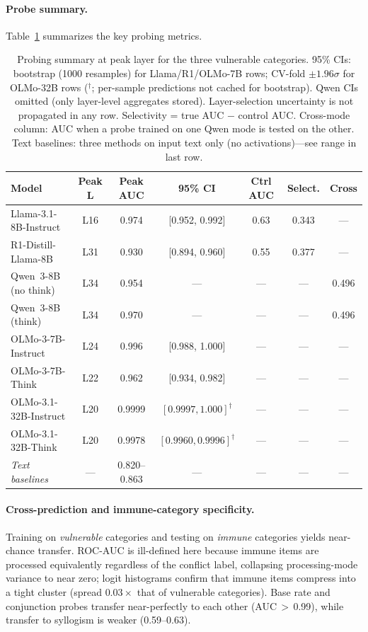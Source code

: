 \documentclass{article}
\begin{document}
\paragraph{Probe summary.}
Table~\ref{tab:probe_summary} summarizes the key probing metrics.

\begin{table}[t]
\centering
\caption{Probing summary at peak layer for the three
  vulnerable categories.  95\% CIs: bootstrap (1000 resamples) for
  Llama/R1/OLMo-7B rows; CV-fold $\pm 1.96\sigma$ for OLMo-32B rows
  (${}^\dagger$; per-sample predictions not cached for bootstrap).
  Qwen CIs omitted (only layer-level aggregates stored).
  Layer-selection uncertainty is not propagated in any row.
  Selectivity = true AUC $-$ control AUC.  Cross-mode column:
  AUC when a probe trained on one Qwen mode is tested on the other.
  Text baselines: three methods on input text only (no activations)---see range in last row.}
\label{tab:probe_summary}
\vspace{4pt}
\small
\begin{tabular}{lcccccc}
\toprule
\textbf{Model} & \textbf{Peak L} & \textbf{Peak AUC} & \textbf{95\% CI} & \textbf{Ctrl AUC} & \textbf{Select.} & \textbf{Cross} \\
\midrule
Llama-3.1-8B-Instruct & L16 & 0.974 & [0.952, 0.992] & 0.63 & 0.343 & --- \\
R1-Distill-Llama-8B   & L31 & 0.930 & [0.894, 0.960] & 0.55 & 0.377 & --- \\
Qwen~3-8B (no think)  & L34 & 0.954 & ---             & ---  & --- & 0.496 \\
Qwen~3-8B (think)     & L34 & 0.970 & ---             & ---  & --- & 0.496 \\
\midrule
OLMo-3-7B-Instruct    & L24 & 0.996 & [0.988, 1.000]  & ---  & --- & --- \\
OLMo-3-7B-Think       & L22 & 0.962 & [0.934, 0.982]  & ---  & --- & --- \\
\midrule
OLMo-3.1-32B-Instruct & L20 & 0.9999 & $[0.9997, 1.000]^\dagger$ & --- & --- & --- \\
OLMo-3.1-32B-Think    & L20 & 0.9978 & $[0.9960, 0.9996]^\dagger$ & --- & --- & --- \\
\midrule
\emph{Text baselines}  & --- & 0.820--0.863 & ---         & ---  & --- & --- \\
\bottomrule
\end{tabular}
\end{table}

\paragraph{Cross-prediction and immune-category specificity.}
Training on \emph{vulnerable} categories and testing on \emph{immune} categories yields near-chance transfer.  ROC-AUC is ill-defined here because immune items are processed equivalently regardless of the conflict label, collapsing processing-mode variance to near zero; logit histograms confirm that immune items compress into a tight cluster (spread $0.03\times$ that of vulnerable categories).  Base rate and conjunction probes transfer near-perfectly to each other (AUC\,$>$\,0.99), while transfer to syllogism is weaker (0.59--0.63).
\end{document}
